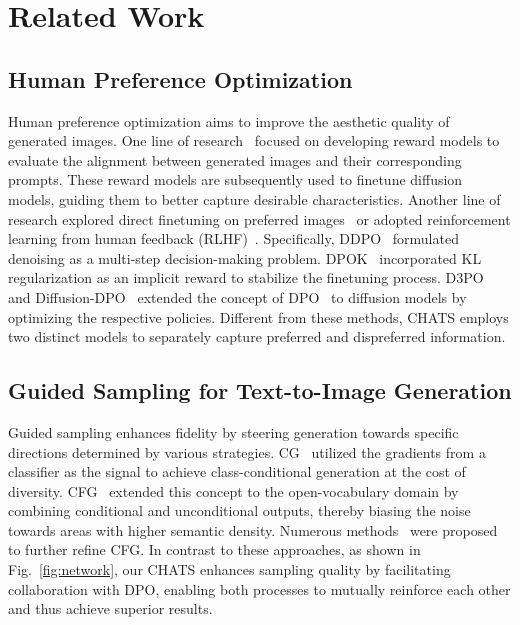 \section{Related Work}
\subsection{Human Preference Optimization}

Human preference optimization aims to improve the aesthetic quality of generated images. One line of research~\cite{image_reward,hpsv2,pickscore,ahf} focused on developing reward models to evaluate the alignment between generated images and their corresponding prompts. These reward models are subsequently used to finetune diffusion models, guiding them to better capture desirable characteristics. Another line of research explored direct finetuning on preferred images~\cite{raft,emu} or adopted reinforcement learning from human feedback (RLHF)~\cite{ddpo,DPOK,d3po,diffusion-dpo}. Specifically, DDPO~\cite{ddpo} formulated denoising as a multi-step decision-making problem. DPOK~\cite{DPOK} incorporated KL regularization as an implicit reward to stabilize the finetuning process. D3PO~\cite{d3po} and Diffusion-DPO~\cite{diffusion-dpo} extended the concept of DPO~\cite{llm_dpo} to diffusion models by optimizing the respective policies. Different from these methods, CHATS employs two distinct models to separately capture preferred and dispreferred information.


\subsection{Guided Sampling for Text-to-Image Generation}

Guided sampling enhances fidelity by steering generation towards specific directions determined by various strategies. CG~\cite{cg} utilized the gradients from a classifier as the signal to achieve class-conditional generation at the cost of diversity. CFG~\cite{cfg} extended this concept to the open-vocabulary domain by combining conditional and unconditional outputs, thereby biasing the noise towards areas with higher semantic density. Numerous methods~\cite{sag,uni_guide,readout,glide} were proposed to further refine CFG. In contrast to these approaches, as shown in Fig.~\ref{fig:network}, our CHATS enhances sampling quality by facilitating collaboration with DPO, enabling both processes to mutually reinforce each other and thus achieve superior results.